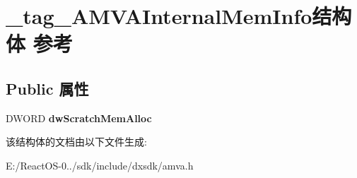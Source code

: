 \hypertarget{struct__tag___a_m_v_a_internal_mem_info}{}\section{\+\_\+tag\+\_\+\+A\+M\+V\+A\+Internal\+Mem\+Info结构体 参考}
\label{struct__tag___a_m_v_a_internal_mem_info}
\subsection*{Public 属性}
\begin{DoxyCompactItemize}
\item 
\mbox{\label{struct__tag___a_m_v_a_internal_mem_info_acad532dd1f1ca333cc7e8bde9319156f}} 
D\+W\+O\+RD {\bfseries dw\+Scratch\+Mem\+Alloc}
\end{DoxyCompactItemize}


该结构体的文档由以下文件生成\+:\begin{DoxyCompactItemize}
\item 
E\+:/\+React\+O\+S-\/0../sdk/include/dxsdk/amva.\+h\end{DoxyCompactItemize}
